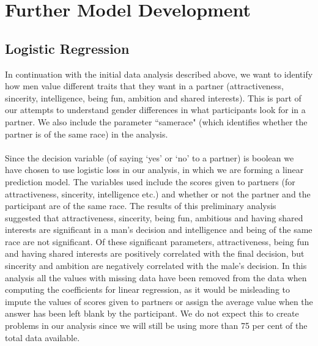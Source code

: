 \documentclass{article}
\begin{document}
\section{Further Model Development}
\subsection{Logistic Regression}
In continuation with the initial data analysis described above, we want to identify how men value different traits that they want in a partner (attractiveness, sincerity, intelligence, being fun, ambition and shared interests). This is part of our attempts to understand gender differences in what participants look for in a partner. We also include the parameter ``samerace" (which identifies whether the partner is of the same race) in the analysis.\\
\null\\
Since the decision variable (of saying `yes' or `no' to a partner) is boolean we have chosen to use logistic loss in our analysis, in which we are forming a linear prediction model. The variables used include the scores given to partners (for attractiveness, sincerity, intelligence etc.) and whether or not the partner and the participant are of the same race. The results of this preliminary analysis suggested that attractiveness, sincerity, being fun, ambitious and having shared interests are significant in a man's decision and intelligence and being of the same race are not significant. Of these significant parameters, attractiveness, being fun and having shared interests are positively correlated with the final decision, but sincerity and ambition are negatively correlated with the male's decision. In this analysis all the values with missing data have been removed from the data when computing the coefficients for linear regression, as it would be misleading to impute the values of scores given to partners or assign the average value when the answer has been left blank by the participant. We do not expect this to create problems in our analysis since we will still be using more than 75 per cent of the total data available. \\
\null\\
\end{document}
